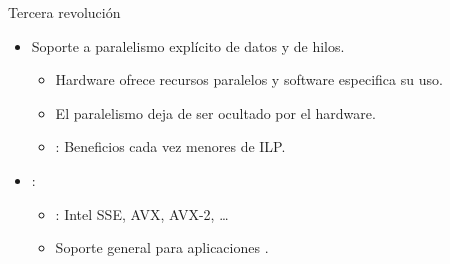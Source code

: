 \begin{frame}[t]{Tercera revolución}
\begin{itemize}
  \item Soporte a paralelismo explícito de datos y de hilos.
    \begin{itemize}
      \item Hardware ofrece recursos paralelos y software especifica su uso.
      \item El paralelismo deja de ser ocultado por el hardware.
      \item {}: Beneficios cada vez menores de ILP.
    \end{itemize}
  \pause
  \item {}:
    \begin{itemize}
      \item {}: Intel SSE, AVX, AVX-2, \ldots
      \item Soporte general para aplicaciones .
    \end{itemize}
\end{itemize}
\end{frame}

